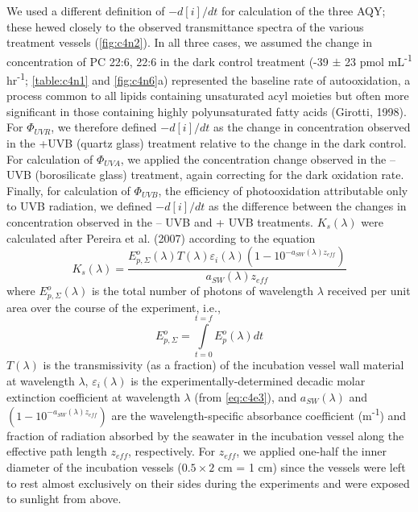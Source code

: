 We used a different definition of $ - d[i]/dt$ for calculation of the three AQY; these hewed closely to the observed transmittance spectra of the various treatment vessels (\autoref{fig:c4n2}). In all three cases, we assumed the change in concentration of PC 22:6, 22:6 in the dark control treatment (-39 $\pm$ 23 pmol mL\textsuperscript{-1} hr\textsuperscript{-1}; \autoref{table:c4n1} and \autoref{fig:c4n6}a) represented the baseline rate of autooxidation, a process common to all lipids containing unsaturated acyl moieties but often more significant in those containing highly polyunsaturated fatty acids (Girotti, 1998). For ${\Phi _{UVR}}$, we therefore defined $ - d[i]/dt$ as the change in concentration observed in the +UVB (quartz glass) treatment relative to the change in the dark control. For calculation of ${\Phi _{UVA}}$, we applied the concentration change observed in the --UVB (borosilicate glass) treatment, again correcting for the dark oxidation rate. Finally, for calculation of ${\Phi _{UVB}}$, the efficiency of photooxidation attributable only to UVB radiation, we defined $ - d[i]/dt$ as the difference between the changes in concentration observed in the -- UVB and + UVB treatments. ${K_s}(\lambda )$ were calculated after Pereira et al. (2007) according to the equation
\begin{equation} \label{eq:c4e7}
{K_s}(\lambda ) = \frac{{E_{p,\Sigma }^o(\lambda )T(\lambda ){\varepsilon _i}(\lambda )(1 - {{10}^{ - {a_{SW}}(\lambda ){z_{eff}}}})}}{{{a_{SW}}(\lambda ){z_{eff}}}}
\end{equation}	
where $E_{p,\Sigma }^o(\lambda )$ is the total number of photons of wavelength $\lambda$ received per unit area over the course of the experiment, i.e.,
\begin{equation} \label{eq:c4e8}
E_{p,\Sigma }^o = \int\limits_{t = 0}^{t = f} {E_p^o(\lambda )dt} 
\end{equation}	
$T(\lambda )$ is the transmissivity (as a fraction) of the incubation vessel wall material at wavelength $\lambda$, ${\varepsilon _i}(\lambda )$ is the experimentally-determined decadic molar extinction coefficient at wavelength $\lambda$ (from \autoref{eq:c4e3}), and ${a_{SW}}(\lambda )$ and $(1 - {10^{ - {a_{SW}}(\lambda ){z_{eff}}}})$ are the wavelength-specific absorbance coefficient (m\textsuperscript{-1}) and fraction of radiation absorbed by the seawater in the incubation vessel along the effective path length ${z_{eff}}$, respectively. For ${z_{eff}}$, we applied one-half the inner diameter of the incubation vessels ($0.5\times2$ cm = 1 cm) since the vessels were left to rest almost exclusively on their sides during the experiments and were exposed to sunlight from above.

